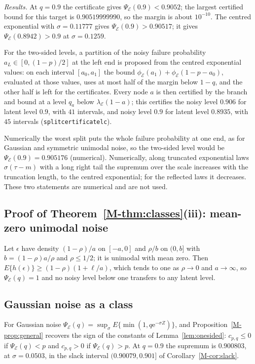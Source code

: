 \documentclass[11pt]{article}
\renewcommand{\_}{\usc\allowbreak}
\begin{document}
\emph{Results.} At $q = 0.9$ the certificate gives $\Psi_{\mathcal E}(0.9) < 0.9052$; the largest certified bound for this target is $0.90519999990$, so the margin is about $10^{-10}$. The centred exponential with $\sigma = 0.11777$ gives $\Psi_{\mathcal E}(0.9) > 0.90517$; it gives $\Psi_{\mathcal E}(0.8942) > 0.9$ at $\sigma = 0.1259$.

For the two-sided levels, a partition of the noisy failure probability $a_L \in [0, (1 - p)/2]$ at the left end is proposed from the centred exponential values: on each interval $[a_0, a_1]$ the bound $\phi_{\mathcal E}(a_1) + \phi_{\mathcal E}(1 - p - a_0)$, evaluated at those values, uses at most half of the margin below $1 - q$, and the other half is left for the certificates. Every node $a$ is then certified by the branch and bound at a level $q_a$ below $\lambda_{\mathcal E}(1 - a)$; this certifies the noisy level $0.906$ for latent level $0.9$, with $41$ intervals, and noisy level $0.9$ for latent level $0.8935$, with $45$ intervals (\texttt{split\_certificate\_lc}).

Numerically the worst split puts the whole failure probability at one end, as for Gaussian and symmetric unimodal noise, so the two-sided level would be $\Psi_{\mathcal E}(0.9) = 0.905176$ (numerical). Numerically, along truncated exponential laws $\sigma(\tau - m)$ with a long right tail the supremum over the scale increases with the truncation length, to the centred exponential; for the reflected laws it decreases. These two statements are numerical and are not used.

\subsection*{Proof of Theorem~\ref{M-thm:classes}(iii): mean-zero unimodal noise}

Let $\epsilon$ have density $(1 - \rho)/a$ on $[-a, 0]$ and $\rho/b$ on $(0, b]$ with $b = (1 - \rho)a/\rho$ and $\rho \le 1/2$; it is unimodal with mean zero. Then $E\{h(\epsilon)\} \ge (1 - \rho)(1 + \ell/a)$, which tends to one as $\rho \to 0$ and $a \to \infty$, so $\Psi_{\mathcal E}(q) = 1$ and no noisy level below one transfers to any latent level.

\subsection*{Gaussian noise as a class}

For Gaussian noise $\Psi_{\mathcal E}(q) = \sup_{\sigma} E\{\min(1, q \mathrm{e}^{-\sigma Z})\}$, and Proposition~\ref{M-prop:general} recovers the sign of the constants of Lemma~\ref{lem:onesided}: $c_{p,q} \le 0$ if $\Psi_{\mathcal E}(q) < p$ and $c_{p,q} > 0$ if $\Psi_{\mathcal E}(q) > p$. At $q = 0.9$ the supremum is $0.900803$, at $\sigma = 0.0503$, in the slack interval $(0.90079, 0.901]$ of Corollary~\ref{M-cor:slack}.
\end{document}
